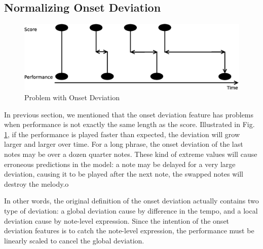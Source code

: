    \subsection{Normalizing Onset Deviation}
   \label{sec:normalize}
\begin{figure}[tp]
   \begin{center}
      \includegraphics[width=\textwidth]{fig/prob_onset_diff}

   \end{center}
   \caption{Problem with Onset Deviation }
   \label{fig:normalizationprob}
\end{figure}
%
In previous section, we mentioned that the onset deviation feature has problems when performance is not exactly the same length as the score. Illustrated in Fig. \ref{fig:normalizationprob}, if the performance is played faster than expected, the deviation will grow larger and larger over time. For a long phrase, the onset deviation of the last notes may be over a dozen quarter notes. These kind of extreme values will cause erroneous predictions in the model: a note may be delayed for a very large deviation, causing it to be played after the next note, the swapped notes will destroy the melody.o
 
In other words, the original definition of the onset deviation actually contains two type of deviation: a global deviation cause by difference in the tempo, and a local deviation cause by note-level expression. Since the intention of the onset deviation features is to catch the note-level expression, the performance must be linearly scaled to cancel the global deviation.


